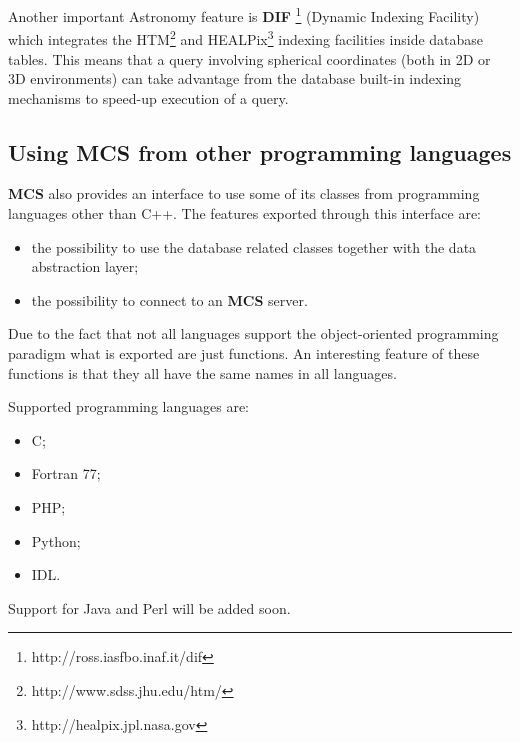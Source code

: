 \documentclass[12pt,titlepage]{article}
\newcommand{\mcs}{\textbf{MCS} }
\newcommand{\dif}{\textbf{DIF} }
\begin{document}
\smallskip

Another important Astronomy feature is
\dif\footnote{http://ross.iasfbo.inaf.it/dif} (Dynamic Indexing
Facility) which integrates the
HTM\footnote{http://www.sdss.jhu.edu/htm/} and
HEALPix\footnote{http://healpix.jpl.nasa.gov} indexing facilities
inside database tables. This means that a query involving spherical
coordinates (both in 2D or 3D environments) can take advantage from
the database built-in indexing mechanisms to speed-up execution of a
query.

%
%



%
\subsection{Using \mcs from other programming languages}
\mcs also provides an interface to use some of its classes from
programming languages other than C++. The features exported through
this interface are:
%
\begin{itemize}
\item the possibility to use the database related classes together with the
  data abstraction layer;
\item the possibility to connect to an \mcs server.
\end{itemize}
%
Due to the fact that not all languages support the object-oriented programming
paradigm what is exported are just functions. An interesting feature of these
functions is that they all have the same names in all languages.

\smallskip
\noindent
Supported programming languages are:
%
\begin{itemize}
\item C;
\item Fortran 77;
\item PHP;
\item Python;
\item IDL.
\end{itemize}
%
Support for Java and Perl will be added soon.
\end{document}

